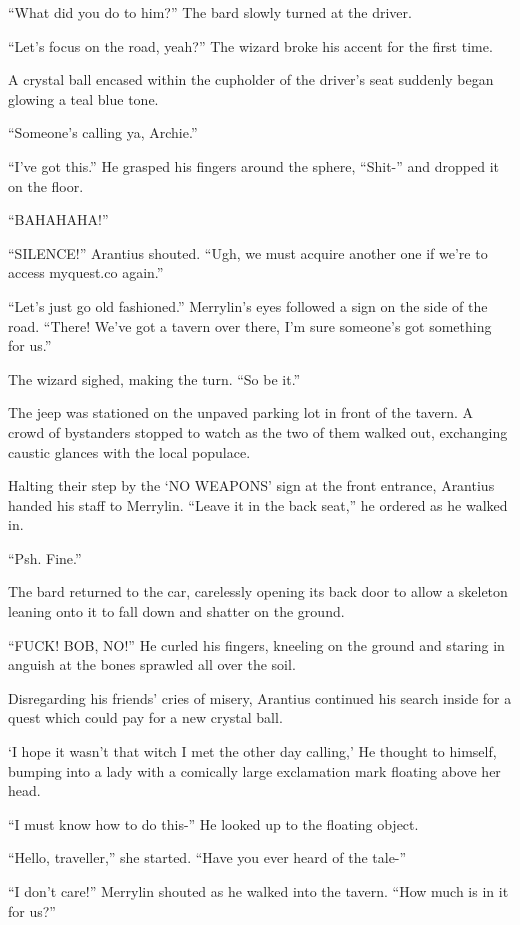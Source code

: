 “What did you do to him?” The bard slowly turned at the driver.

“Let’s focus on the road, yeah?” The wizard broke his accent for the first time.

A crystal ball encased within the cupholder of the driver’s seat suddenly began glowing a teal blue tone.

“Someone’s calling ya, Archie.”

“I’ve got this.” He grasped his fingers around the sphere, “Shit-” and dropped it on the floor.

“BAHAHAHA!”

“SILENCE!” Arantius shouted. “Ugh, we must acquire another one if we’re to access myquest.co again.”

“Let’s just go old fashioned.” Merrylin’s eyes followed a sign on the side of the road. “There! We’ve got a tavern over there, I’m sure someone’s got something for us.”

The wizard sighed, making the turn. “So be it.”

The jeep was stationed on the unpaved parking lot in front of the tavern. A crowd of bystanders stopped to watch as the two of them walked out, exchanging caustic glances with the local populace.

Halting their step by the ‘NO WEAPONS’ sign at the front entrance, Arantius handed his staff to Merrylin.  “Leave it in the back seat,” he ordered as he walked in.

“Psh. Fine.”

The bard returned to the car, carelessly opening its back door to allow a skeleton leaning onto it to fall down and shatter on the ground.

“FUCK! BOB, NO!” He curled his fingers, kneeling on the ground and staring in anguish at the bones sprawled all over the soil.

Disregarding his friends’ cries of misery, Arantius continued his search inside for a quest which could pay for a new crystal ball.

‘I hope it wasn’t that witch I met the other day calling,’ He thought to himself, bumping into a lady with a comically large exclamation mark floating above her head.

“I must know how to do this-” He looked up to the floating object.

“Hello, traveller,” she started. “Have you ever heard of the tale-”

“I don’t care!” Merrylin shouted as he walked into the tavern. “How much is in it for us?”

